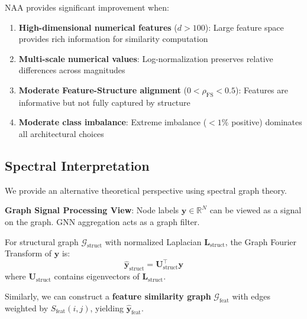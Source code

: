 \begin{corollary}
\label{cor:naa_conditions}
NAA provides significant improvement when:
\begin{enumerate}
    \item \textbf{High-dimensional numerical features} ($d > 100$): Large feature space provides rich information for similarity computation
    \item \textbf{Multi-scale numerical values}: Log-normalization preserves relative differences across magnitudes
    \item \textbf{Moderate Feature-Structure alignment} ($0 < \rho_{\text{FS}} < 0.5$): Features are informative but not fully captured by structure
    \item \textbf{Moderate class imbalance}: Extreme imbalance ($<1\%$ positive) dominates all architectural choices
\end{enumerate}
\end{corollary}

\subsection{Spectral Interpretation}
\label{sec:spectral}

We provide an alternative theoretical perspective using spectral graph theory.

\textbf{Graph Signal Processing View}: Node labels $\mathbf{y} \in \mathbb{R}^N$ can be viewed as a signal on the graph. GNN aggregation acts as a graph filter.

For structural graph $\mathcal{G}_{\text{struct}}$ with normalized Laplacian $\mathbf{L}_{\text{struct}}$, the Graph Fourier Transform of $\mathbf{y}$ is:
\begin{equation}
\hat{\mathbf{y}}_{\text{struct}} = \mathbf{U}_{\text{struct}}^\top \mathbf{y}
\end{equation}
where $\mathbf{U}_{\text{struct}}$ contains eigenvectors of $\mathbf{L}_{\text{struct}}$.

Similarly, we can construct a \textbf{feature similarity graph} $\mathcal{G}_{\text{feat}}$ with edges weighted by $S_{\text{feat}}(i,j)$, yielding $\hat{\mathbf{y}}_{\text{feat}}$.

